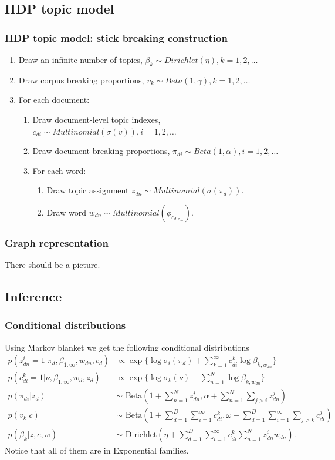 \documentclass{beamer}
\begin{document}
\subsection{HDP topic model}
\begin{frame}
\frametitle{HDP topic model: stick breaking construction}
\begin{enumerate}
	\item Draw an infinite number of topics, $\beta_k\sim Dirichlet(\eta), k = 1, 2, \dots$
	\item Draw corpus breaking proportions, $v_k\sim Beta(1, \gamma), k=1, 2, \dots$
	\item For each document:
	\begin{enumerate}
		\item Draw document-level topic indexes, $c_{di}\sim Multinomial(\sigma(v)), i = 1, 2, \dots$
		\item Draw document breaking proportions, $\pi_{di}\sim Beta(1, \alpha), i = 1, 2, \dots$
		\item For each word:
		\begin{enumerate}
			\item Draw topic assignment $z_{dn}\sim Multinomial(\sigma(\pi_d))$.
			\item Draw word $w_{dn}\sim Multinomial(\phi_{c_{d, z_{dn}}})$.
		\end{enumerate}
	\end{enumerate}
\end{enumerate}
\end{frame}

\begin{frame}
\frametitle{Graph representation}
There should be a picture.
\end{frame}

\subsection{Inference}
\begin{frame}
\frametitle{Conditional distributions}
Using Markov blanket we get the following conditional distributions
\begin{align*}
p(z_{dn}^i=1|\pi_d, \beta_{1:\infty},w_{dn},c_d) & \propto \exp\{\log\sigma_i(\pi_d)+\sum\limits_{k=1}^{\infty}c_{di}^k\log\beta_{k,w_{dn}}\}\\
p(c_{di}^k=1|\nu, \beta_{1:\infty},w_d, z_d) & \propto \exp\{\log\sigma_k(\nu)+\sum\limits_{n=1}^{N}\log\beta_{k,w_{dn}}\}\\
p(\pi_{di}|z_d) & \sim \text{ Beta}(1+\sum\limits_{n=1}^{N}z_{dn}^i, \alpha+\sum\limits_{n=1}^{N}\sum_{j>i}z_{dn}^j)\\
p(v_k|c) & \sim \text{ Beta}(1+\sum\limits_{d=1}^{D}\sum\limits_{i=1}^{\infty}c_{di}^k, \omega+\sum\limits_{d=1}^{D}\sum\limits_{i=1}^{\infty}\sum_{j>k}c_{di}^j)\\
p(\beta_k|z,c,w) & \sim \text{ Dirichlet}(\eta+\sum\limits_{d=1}^{D}\sum\limits_{i=1}^{\infty}c_{di}^k\sum\limits_{n=1}^{N}z_{dn}^iw_{dn}).
\end{align*}
Notice that all of them are in Exponential families.
\end{frame}
\end{document}

